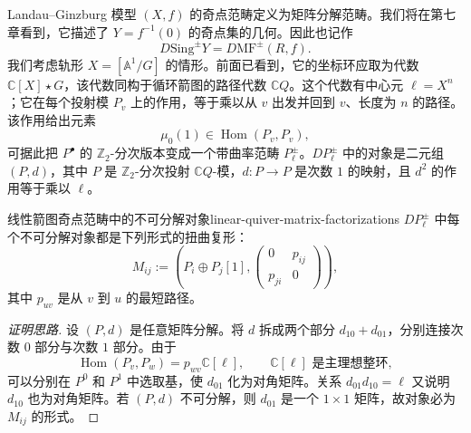 Landau–Ginzburg 模型 $(X,f)$ 的奇点范畴定义为矩阵分解范畴。我们将在第七章看到，它描述了 $Y=f^{-1}(0)$ 的奇点集的几何。因此也记作
\[
  D\mathrm{Sing}^{\pm}Y=D\mathrm{MF}^{\pm}(R,f).
\]
我们考虑轨形 $X=[\mathbb A^1/G]$ 的情形。前面已看到，它的坐标环应取为代数 $\mathbb C[X]\star G$，该代数同构于循环箭图的路径代数 $\mathbb C Q$。这个代数有中心元 $\ell=X^n$；它在每个投射模 $P_v$ 上的作用，等于乘以从 $v$ 出发并回到 $v$、长度为 $n$ 的路径。该作用给出元素
\[
  \mu_0(1)\in\operatorname{Hom}(P_v,P_v),
\]
可据此把 $P^\bullet$ 的 $\mathbb Z_2$-分次版本变成一个带曲率范畴 $P^\pm_\ell$。$DP^\pm_\ell$ 中的对象是二元组 $(P,d)$，其中 $P$ 是 $\mathbb Z_2$-分次投射 $\mathbb C Q$-模，$d\colon P\to P$ 是次数 $1$ 的映射，且 $d^2$ 的作用等于乘以 $\ell$。

\begin{theorem}{线性箭图奇点范畴中的不可分解对象}{linear-quiver-matrix-factorizations}
$DP^\pm_\ell$ 中每个不可分解对象都是下列形式的扭曲复形：
\[
  M_{ij}:=\left(P_i\oplus P_j[1],
  \begin{pmatrix}0&p_{ij}\\p_{ji}&0\end{pmatrix}\right),
\]
其中 $p_{uv}$ 是从 $v$ 到 $u$ 的最短路径。
\end{theorem}
\begin{proof}[证明思路]
设 $(P,d)$ 是任意矩阵分解。将 $d$ 拆成两个部分 $d_{10}+d_{01}$，分别连接次数 $0$ 部分与次数 $1$ 部分。由于
\[
  \operatorname{Hom}(P_v,P_w)=p_{wv}\mathbb C[\ell],
  \qquad \mathbb C[\ell]\text{ 是主理想整环},
\]
可以分别在 $P^0$ 和 $P^1$ 中选取基，使 $d_{01}$ 化为对角矩阵。关系 $d_{01}d_{10}=\ell$ 又说明 $d_{10}$ 也为对角矩阵。若 $(P,d)$ 不可分解，则 $d_{01}$ 是一个 $1\times1$ 矩阵，故对象必为 $M_{ij}$ 的形式。
\end{proof}


